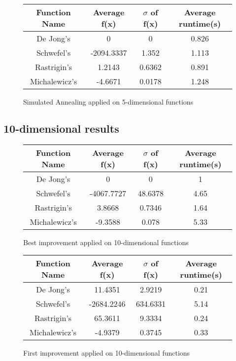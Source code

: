 \documentclass{article}
\begin{document}
\begin{figure}[H]
\begin{tabular}{|c||c|c|c|} \hline
	Function Name & Average f(x) & $\sigma$ of f(x) & Average runtime(s) \\ \hline \hline
	De Jong's & 0 & 0 & 0.826 \\ \hline
	Schwefel's & -2094.3337 & 1.352 & 1.113 \\ \hline
	Rastrigin's & 1.2143 & 0.6362 & 0.891 \\ \hline
	Michalewicz's & -4.6671 & 0.0178 & 1.248 \\ \hline
\end{tabular}
\caption{Simulated Annealing applied on 5-dimensional functions}
\end{figure}

\subsection{10-dimensional results}

\begin{figure}[H]
\begin{tabular}{|c||c|c|c|} \hline
	Function Name & Average f(x) & $\sigma$ of f(x) & Average runtime(s) \\ \hline \hline
	De Jong's & 0 & 0 & 1 \\ \hline
	Schwefel's & -4067.7727 & 48.6378 & 4.65 \\ \hline
	Rastrigin's & 3.8668 & 0.7346 & 1.64 \\ \hline
	Michalewicz's & -9.3588 & 0.078 & 5.33 \\ \hline
\end{tabular}
\caption{Best improvement applied on 10-dimensional functions}
\end{figure}

\begin{figure}[H]
\begin{tabular}{|c||c|c|c|} \hline
	Function Name & Average f(x) & $\sigma$ of f(x) & Average runtime(s) \\ \hline \hline
	De Jong's & 11.4351 & 2.9219 & 0.21 \\ \hline
	Schwefel's & -2684.2246 & 634.6331 & 5.14 \\ \hline
	Rastrigin's & 65.3611 & 9.3334 & 0.24 \\ \hline
	Michalewicz's & -4.9379 & 0.3745 & 0.33 \\ \hline
\end{tabular}
\caption{First improvement applied on 10-dimensional functions}
\end{figure}
\end{document}
